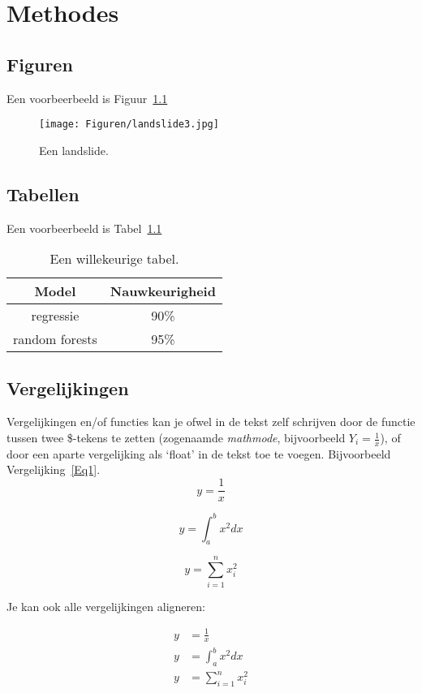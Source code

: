 \chapter{Methodes}

\section{Figuren}
Een voorbeerbeeld is Figuur~\ref{Landslide}
\begin{figure}[h] %
    \centering %
    \texttt{[image: Figuren/landslide3.jpg]}
    \caption{Een landslide.}
    \label{Landslide}
\end{figure}

\newpage

\section{Tabellen}
Een voorbeerbeeld is Tabel~\ref{Tabel1}
\begin{table}[h]
    \centering
    \begin{tabular}{|c|c|}
        \hline
       \bf Model  & \bf Nauwkeurigheid  \\ \hline
        regressie & 90\%                \\ \hline
        random forests & 95\%           \\ \hline
    \end{tabular}
    \caption{Een willekeurige tabel.}
    \label{Tabel1}
\end{table}

\newpage

\section{Vergelijkingen}
Vergelijkingen en/of functies kan je ofwel in de tekst zelf schrijven door de functie tussen twee \$-tekens te zetten (zogenaamde \textit{mathmode}, bijvoorbeeld $Y_i=\frac{1}{x}$), of door een aparte vergelijking als `float' in de tekst toe te voegen. Bijvoorbeeld Vergelijking~\ref{Eq1}.
\begin{equation}\label{Eq1}
    y=\frac{1}{x}
\end{equation}

\begin{equation}
    y=\int_{a}^{b} x^2 dx
\end{equation}

\begin{equation}
    y=\sum_{i=1}^{n} x_i^2
\end{equation}

Je kan ook alle vergelijkingen aligneren:

\begin{align}
    y &=\frac{1}{x} \\
    y &=\int_{a}^{b} x^2 dx \\
    y &=\sum_{i=1}^{n} x_i^2
\end{align}